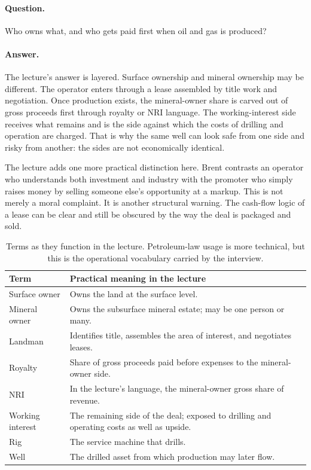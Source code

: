 \paragraph{Question.} Who owns what, and who gets paid first when oil and gas is produced?

\paragraph{Answer.} The lecture's answer is layered. Surface ownership and mineral ownership may be different. The operator enters through a lease assembled by title work and negotiation. Once production exists, the mineral-owner share is carved out of gross proceeds first through royalty or NRI language. The working-interest side receives what remains and is the side against which the costs of drilling and operation are charged. That is why the same well can look safe from one side and risky from another: the sides are not economically identical.

The lecture adds one more practical distinction here. Brent contrasts an operator who understands both investment and industry with the promoter who simply raises money by selling someone else's opportunity at a markup. This is not merely a moral complaint. It is another structural warning. The cash-flow logic of a lease can be clear and still be obscured by the way the deal is packaged and sold.

\begin{table}[h]
\centering
\begin{tabular}{|l|p{8.5cm}|}
\hline
Term & Practical meaning in the lecture \\
\hline
Surface owner & Owns the land at the surface level. \\
Mineral owner & Owns the subsurface mineral estate; may be one person or many. \\
Landman & Identifies title, assembles the area of interest, and negotiates leases. \\
Royalty & Share of gross proceeds paid before expenses to the mineral-owner side. \\
NRI & In the lecture's language, the mineral-owner gross share of revenue. \\
Working interest & The remaining side of the deal; exposed to drilling and operating costs as well as upside. \\
Rig & The service machine that drills. \\
Well & The drilled asset from which production may later flow. \\
\hline
\end{tabular}
\caption{Terms as they function in the lecture. Petroleum-law usage is more technical, but this is the operational vocabulary carried by the interview.}
\end{table}

